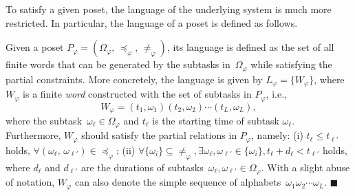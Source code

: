To satisfy a given poset, the language of the underlying system is
much more restricted.
In particular, the language of a poset is defined as follows.

\begin{definition}\label{def:language-poset}
Given a poset $P_\varphi=(\Omega_{\varphi}, \, \preceq_{\varphi}, \, \neq_{\varphi})$,
its language is defined as the set of all finite words
that can be generated by the subtasks in~$\Omega_{\varphi}$
while satisfying the partial constraints.
More concretely, the language is given by
$L_\varphi=\{W_{\varphi}\}$, where $W_{\varphi}$ is a finite
\emph{word} constructed with the set of subtasks in $P_\varphi$, i.e.,
\begin{equation}\label{eq:poset-language}
W_{\varphi}=(t_1,\omega_1) (t_2,\omega_2)\cdots (t_L,\omega_L),
\end{equation}
where the subtask~$\omega_\ell \in \Omega_\varphi$ and
$t_\ell$ is the starting time of subtask $\omega_\ell$.
Furthermore, $W_{\varphi}$ should satisfy the partial relations in $P_\varphi$, namely:
(i) $t_\ell \leq t_{\ell'}$ holds,
$\forall (\omega_\ell,\,\omega_{\ell'})\in \preceq_{\varphi}$;
(ii) $\forall \{\omega_{i}\}\subseteq \neq_{\varphi},
\exists\omega_{\ell},\omega_{\ell'}\in\{\omega_{i}\}, t_\ell + d_\ell <  t_{\ell'}$ holds,
where $d_\ell$ and $d_{\ell'}$ are the durations of
subtasks~$\omega_\ell, \omega_{\ell'} \in \Omega_{\varphi}$.
With a slight abuse of notation, $W_\varphi$ can also denote the
simple sequence of alphabets~$\omega_1\omega_2\cdots \omega_L$.
\hfill $\blacksquare$
\end{definition}



